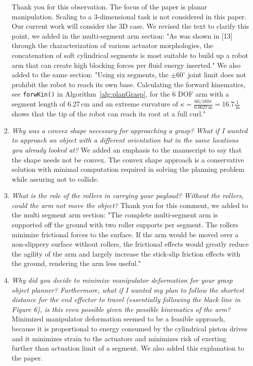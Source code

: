\documentclass[letterpaper, 10 pt, twocolumn, conference]{article}
\newcommand{\unit}[1]{\ensuremath{\, \mathrm{#1}}} %
\begin{document}
\begin{enumerate}
%
Thank you for this observation. The focus of the paper is planar manipulation. Scaling to a 3-dimensional task is not considered in this paper. Our current work will consider the 3D case.
We revised the text to clarify this point, we added in the multi-segment arm section: 
"As was shown in [13] through the characterization of various actuator morphologies, the concatenation of soft cylindrical segments is most suitable to build up a robot arm that can create high blocking forces per fluid energy inserted."
We also added to the same section:
"Using six segments, the $\pm 60^\circ$ joint limit does not prohibit the robot to reach its own base. Calculating the forward kinematics, see \texttt{forwKin()} in Algorithm~\ref{alg:planGrasp}, for the 6 DOF arm with a segment length of 6.27\unit{cm} and an extreme curvature of $\kappa = \frac{60/180 \pi}{0.0627\unit{m}} = 16.7\frac{1}{\unit{m}}$ shows that the tip of the robot can reach its root at a full curl." 
%
\item \textit{Why was a convex shape necessary for approaching a grasp? What if I wanted to approach an object with a different orientation but in the same locations you already looked at?}
%
We added an emphasis to the manuscript to say that the shape needs not be convex. The convex shape approach is a conservative solution with minimal computation required in solving the planning problem while assuring not to collide. 
%
\item \textit{What is the role of the rollers in carrying your payload? Without the rollers, could the arm not move the object?}
%
Thank you for this comment, we added to the multi segment arm section:
"The complete multi-segment arm is supported off the ground with two roller supports per segment. 
The rollers minimize frictional forces to the surface. 
If the arm would be moved over a non-slippery surface without rollers, the frictional effects would greatly reduce the agility of the arm and largely increase the stick-slip friction effects with the ground, rendering the arm less useful."
%
\item \textit{Why did you decide to minimize manipulator deformation for your grasp object planner? Furthermore, what if I wanted my plan to follow the shortest distance for the end effector to travel (essentially following the black line in Figure 6), is this even possible given the possible kinematics of the arm?}
%
Minimized manipulator deformation seemed to be a feasible approach, because it is proportional to energy consumed by the cylindrical piston drives and it minimizes strain to the actuators and minimizes risk of exerting further than actuation limit of a segment. We also added this explanation to the paper. 
%
\end{enumerate}
%
\end{document}
